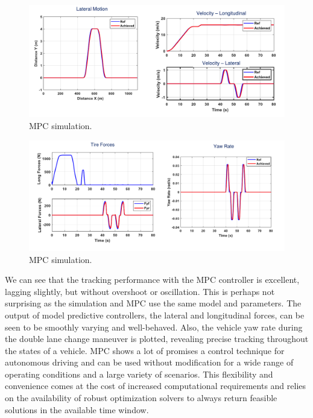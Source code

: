 \begin{figure}[!htb]
\begin{center}
\includegraphics[scale=0.280]{img/lateral_control/mpc_4.jpeg}
\end{center}
\caption{MPC simulation.}
\label{mpc_4}
\end{figure}

\begin{figure}[!htb]
\begin{center}
\includegraphics[scale=0.280]{img/lateral_control/mpc_5.jpeg}
\end{center}
\caption{MPC simulation.}
\label{mpc_5}
\end{figure}

We can see that
the tracking performance with the MPC controller is excellent, lagging slightly, but without
overshoot or oscillation. This is perhaps not
surprising as the simulation and MPC use the same
model and parameters. The output of model
predictive controllers, the lateral and longitudinal forces, can be seen to be smoothly
varying and well-behaved. Also, the vehicle yaw rate during the double lane change
maneuver is plotted, revealing precise tracking
throughout the states of a vehicle. MPC shows a lot of promises a control technique for
autonomous driving and can be used without modification
for a wide range of operating conditions and
a large variety of scenarios. This flexibility and
convenience comes at the cost of increased computational
requirements and relies on the availability of
robust optimization solvers to always return feasible solutions
in the available time window. 

